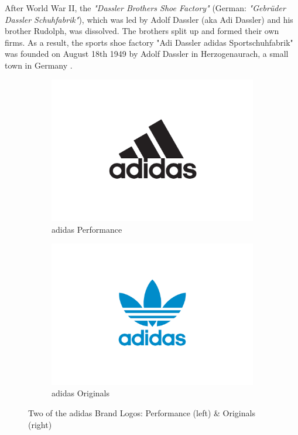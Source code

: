 

After World War II, the \textit{"Dassler Brothers Shoe Factory"} (German: \textit{"Gebrüder Dassler Schuhfabrik"}), which was led by Adolf Dassler (\acs{aka} Adi Dassler) and his brother Rudolph, was dissolved. The brothers split up and formed their own firms. As a result, the sports shoe factory "Adi Dassler adidas Sportschuhfabrik" was founded on August 18th 1949 by Adolf Dassler in Herzogenaurach, a small town in Germany \citep{adidas-group}.

\begin{figure}[H]
\centering
\begin{subfigure}{.4\textwidth}
  \centering
  \includegraphics[width=\linewidth]{figures/adidas_performance_logo.jpg}
  \caption{adidas Performance}
  \label{fig:adidas_performance_logo}
\end{subfigure}
\begin{subfigure}{.4\textwidth}
  \centering
  \includegraphics[width=\linewidth]{figures/adidas_originals_logo.jpg}
  \caption{adidas Originals}
  \label{fig:adidas_originals_logo}
\end{subfigure}
\caption{Two of the adidas Brand Logos: Performance (left) \& Originals (right) \citep{adidasmediacenter}}
\label{fig:adidas_logos}
\end{figure}


